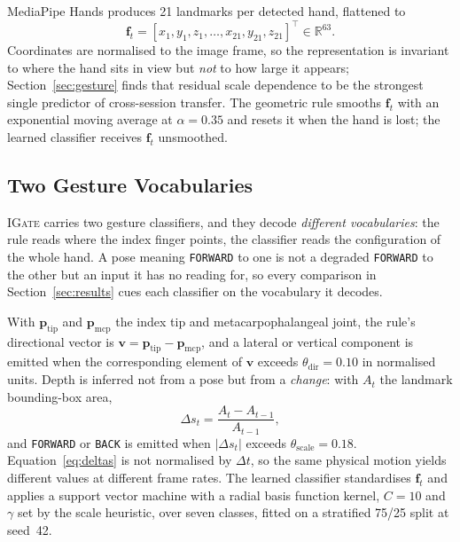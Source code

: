 \documentclass[conference]{IEEEtran}
\newcommand{\method}[1]{\textsc{#1}}
\begin{document}
MediaPipe Hands produces 21 landmarks per detected hand, flattened to
\begin{equation}
\mathbf{f}_t=[x_1,y_1,z_1,\dots,x_{21},y_{21},z_{21}]^{\!\top}\in\mathbb{R}^{63}.
\label{eq:feat}
\end{equation}
Coordinates are normalised to the image frame, so the representation is
invariant to where the hand sits in view but \emph{not} to how large it appears;
Section~\ref{sec:gesture} finds that residual scale dependence to be the
strongest single predictor of cross-session transfer.
The geometric rule smooths $\mathbf{f}_t$ with an exponential moving average at
$\alpha=0.35$ and resets it when the hand is lost; the learned classifier
receives $\mathbf{f}_t$ unsmoothed.

\subsection{Two Gesture Vocabularies}

\method{IGate} carries two gesture classifiers, and they decode \emph{different
vocabularies}: the rule reads where the index finger points, the classifier
reads the configuration of the whole hand.
A pose meaning \texttt{FORWARD} to one is not a degraded \texttt{FORWARD} to the other but an
input it has no reading for, so every comparison in Section~\ref{sec:results}
cues each classifier on the vocabulary it decodes.

With $\mathbf{p}_{\mathrm{tip}}$ and $\mathbf{p}_{\mathrm{mcp}}$ the index tip
and metacarpophalangeal joint, the rule's directional vector is
$\mathbf{v}=\mathbf{p}_{\mathrm{tip}}-\mathbf{p}_{\mathrm{mcp}}$, and a lateral
or vertical component is emitted when the corresponding element of $\mathbf{v}$
exceeds $\theta_{\mathrm{dir}}=0.10$ in normalised units.
Depth is inferred not from a pose but from a \emph{change}: with $A_t$ the
landmark bounding-box area,
\begin{equation}
\Delta s_t=\frac{A_t-A_{t-1}}{A_{t-1}},
\label{eq:deltas}
\end{equation}
and \texttt{FORWARD} or \texttt{BACK} is emitted when $|\Delta s_t|$ exceeds
$\theta_{\mathrm{scale}}=0.18$.
Equation~\eqref{eq:deltas} is not normalised by $\Delta t$, so the same physical
motion yields different values at different frame rates.
The learned classifier standardises $\mathbf{f}_t$ and applies a support vector
machine with a radial basis function kernel, $C=10$ and $\gamma$ set by the
scale heuristic, over seven classes, fitted on a stratified 75/25 split at
seed~42.
\end{document}
